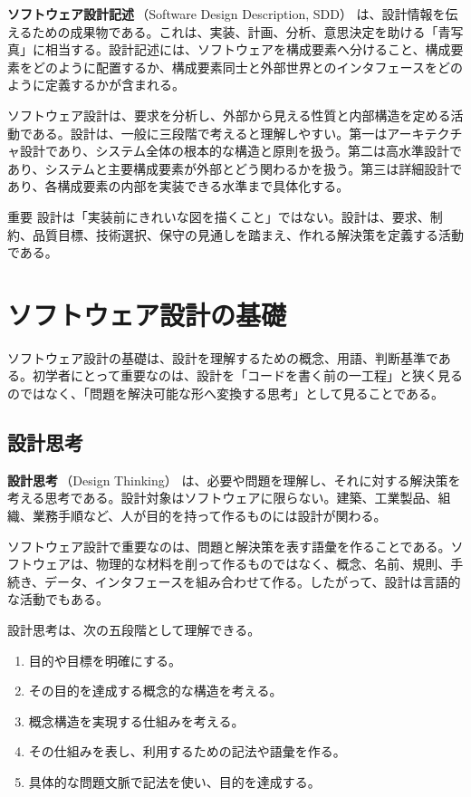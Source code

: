 \documentclass[10.5pt,a4paper]{ltjsarticle}
\newcommand{\term}[2]{\textbf{#1}\,（#2）}
\begin{document}
\term{ソフトウェア設計記述}{Software Design Description, SDD} は、設計情報を伝えるための成果物である。これは、実装、計画、分析、意思決定を助ける「青写真」に相当する。設計記述には、ソフトウェアを構成要素へ分けること、構成要素をどのように配置するか、構成要素同士と外部世界とのインタフェースをどのように定義するかが含まれる。

ソフトウェア設計は、要求を分析し、外部から見える性質と内部構造を定める活動である。設計は、一般に三段階で考えると理解しやすい。第一はアーキテクチャ設計であり、システム全体の根本的な構造と原則を扱う。第二は高水準設計であり、システムと主要構成要素が外部とどう関わるかを扱う。第三は詳細設計であり、各構成要素の内部を実装できる水準まで具体化する。

\begin{pointbox}{重要}
設計は「実装前にきれいな図を描くこと」ではない。設計は、要求、制約、品質目標、技術選択、保守の見通しを踏まえ、作れる解決策を定義する活動である。
\end{pointbox}

\section{ソフトウェア設計の基礎}

ソフトウェア設計の基礎は、設計を理解するための概念、用語、判断基準である。初学者にとって重要なのは、設計を「コードを書く前の一工程」と狭く見るのではなく、「問題を解決可能な形へ変換する思考」として見ることである。

\subsection{設計思考}

\term{設計思考}{Design Thinking} は、必要や問題を理解し、それに対する解決策を考える思考である。設計対象はソフトウェアに限らない。建築、工業製品、組織、業務手順など、人が目的を持って作るものには設計が関わる。

ソフトウェア設計で重要なのは、問題と解決策を表す語彙を作ることである。ソフトウェアは、物理的な材料を削って作るものではなく、概念、名前、規則、手続き、データ、インタフェースを組み合わせて作る。したがって、設計は言語的な活動でもある。

設計思考は、次の五段階として理解できる。
\begin{enumerate}
  \item 目的や目標を明確にする。
  \item その目的を達成する概念的な構造を考える。
  \item 概念構造を実現する仕組みを考える。
  \item その仕組みを表し、利用するための記法や語彙を作る。
  \item 具体的な問題文脈で記法を使い、目的を達成する。
\end{enumerate}
\end{document}
